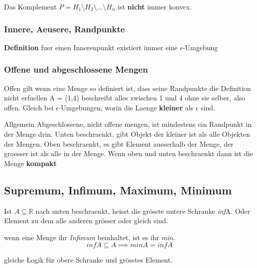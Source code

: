 \begin{theorem}
    Das Komplement $P = H_1 \setminus H_2 \setminus \dots \setminus H_n$ ist \textbf{nicht} immer konvex.
\end{theorem}


\subsubsection{Innere, Aeusere, Randpunkte}

\textbf{Definition} fuer einen Innerenpunkt existiert immer eine $\epsilon$-Umgebung 

\subsubsection{Offene und abgeschlossene Mengen}

Offen gilt wenn eine Menge so definiert ist, dass seine Randpunkte die Definition nicht erfuellen A = (1,4) beschreibt alles zwischen 1 und 4 ohne sie selber, also offen.
Gleich bei $\epsilon$-Umgebungen, worin die Laenge \textbf{kleiner} als $\epsilon$ sind. 

Allgemein Abgeschlossene, nicht offene mengen, ist mindestens ein Randpunkt in der Menge drin. Unten beschraenkt, gibt Objekt der kleiner ist als alle Objekten der Mengen. Oben beschraenkt, es gibt Element ausserhalb der Menge, der groesser ist als alle in der Menge. 
Wenn oben und unten beschraenkt dann ist die Menge \textbf{kompakt}

\subsection{Supremum, Infimum, Maximum, Minimum}

\begin{definition}
   [Infimum] Ist $ A \subseteq \mathbb{R}$ nach unten beschraenkt, heisst die grösste untere Schranke \textit{inf}A. Oder Element zu dem alle anderen grösser oder gleich sind.
\end{definition}

\begin{definition}
    [Minimum] wenn eine Menge ihr \textit{Infimum} beinhaltet, ist es ihr \textit{min}.
    \begin{equation}
         infA \subseteq A \implies minA = infA
    \end{equation}
\end{definition}

\begin{definition}
     gleiche Logik für obere Schranke und grösstes Element.
\end{definition}